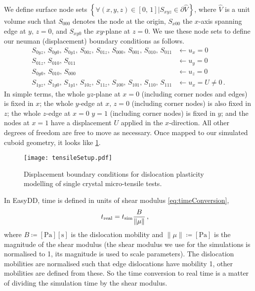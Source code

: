 We define surface node sets $\left\{\forall (x, y, z) \in [0,\, 1] \vert S_{xyz} \in \partial \hat{V}\right\}$, where $\hat{V}$ is a unit volume such that $S_{000}$ denotes the node at the origin, $S_{x00}$ the $x$-axis spanning edge at $y,\, z=0$, and $S_{xy0}$ the $xy$-plane at $z=0$. We use these node sets to define our neuman (displacement) boundary conditions as follows.
\begin{subequations}
    \begin{align}
        S_{0yz},\, S_{0y0},\, S_{0y1},\, S_{00z},\, S_{01z},\, S_{000},\, S_{001},\, S_{010},\, S_{011} & \gets u_x = 0           \\
        S_{01z},\, S_{010},\, S_{011}                                                                   & \gets u_y = 0           \\
        S_{0y0},\, S_{010},\, S_{000}                                                                   & \gets u_z = 0           \\
        S_{1yz},\, S_{1y0},\, S_{1y1},\, S_{10z},\, S_{11z},\, S_{100},\, S_{101},\, S_{110},\, S_{111} & \gets u_x = U \neq 0\,.
    \end{align}
\end{subequations}
In simple terms, the whole $yz$-plane at $x=0$ (including corner nodes and edges) is fixed in $x$; the whole $y$-edge at $x,\,z=0$ (including corner nodes) is also fixed in $z$; the whole $z$-edge at $x = 0\,\, y = 1$ (including corner nodes) is fixed in $y$; and the nodes at $x=1$ have a displacement $U$ applied in the $x$-direction. All other degrees of freedom are free to move as necessary. Once mapped to our simulated cuboid geometry, it looks like \cref{f:tensileSetup}.
\begin{figure}
    \centering
    \texttt{[image: tensileSetup.pdf]}
    \caption[Displacement boundary conditions for dislocation plasticity modelling of single crystal micro-tensile tests.]{Displacement boundary conditions for dislocation plasticity modelling of single crystal micro-tensile tests.}
    \label{f:tensileSetup}
\end{figure}

In EasyDD, time is defined in units of shear modulus \cref{eq:timeConversion},
\begin{align}\label{eq:timeConversion}
    t_{\textrm{real}} & = t_{\textrm{sim}} \dfrac{B}{\lVert\mu\rVert}\,,
\end{align}
where $B \coloneqq [\si{\pascal}][\si{\second}]$ is the dislocation mobility and $\lVert\mu\rVert \coloneqq [\si{\pascal}]$ is the magnitude of the shear modulus (the shear modulus we use for the simulations is normalised to 1, its magnitude is used to scale parameters). The dislocation mobilities are normalised such that edge dislocations have mobility 1, other mobilities are defined from these. So the time conversion to real time is a matter of dividing the simulation time by the shear modulus.

